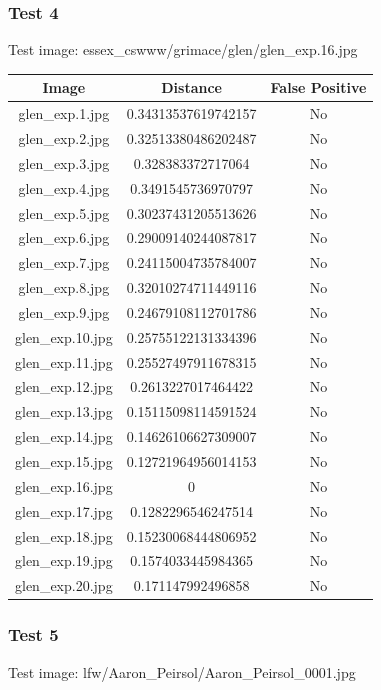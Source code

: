 \documentclass[12pt]{article}
\begin{document}
\newpage
\subsubsection{Test 4}
Test image: essex\_cswww/grimace/glen/glen\_exp.16.jpg

\begin{center}
\begin{tabular}{ccc}
Image & Distance & False Positive \\
\hline
glen\_exp.1.jpg & 0.34313537619742157 & No \\
glen\_exp.2.jpg & 0.32513380486202487 & No \\
glen\_exp.3.jpg & 0.328383372717064 & No \\
glen\_exp.4.jpg & 0.3491545736970797 & No \\
glen\_exp.5.jpg & 0.30237431205513626 & No \\
glen\_exp.6.jpg & 0.29009140244087817 & No \\
glen\_exp.7.jpg & 0.24115004735784007 & No \\
glen\_exp.8.jpg & 0.32010274711449116 & No \\
glen\_exp.9.jpg & 0.24679108112701786 & No \\
glen\_exp.10.jpg & 0.25755122131334396 & No \\
glen\_exp.11.jpg & 0.25527497911678315 & No \\
glen\_exp.12.jpg & 0.2613227017464422 & No \\
glen\_exp.13.jpg & 0.15115098114591524 & No \\
glen\_exp.14.jpg & 0.14626106627309007 & No \\
glen\_exp.15.jpg & 0.12721964956014153 & No \\
glen\_exp.16.jpg & 0 & No \\
glen\_exp.17.jpg & 0.1282296546247514 & No \\
glen\_exp.18.jpg & 0.15230068444806952 & No \\
glen\_exp.19.jpg & 0.1574033445984365 & No \\
glen\_exp.20.jpg & 0.171147992496858 & No \\
\end{tabular}
\end{center}

\subsubsection{Test 5}
Test image: lfw/Aaron\_Peirsol/Aaron\_Peirsol\_0001.jpg
\end{document}

